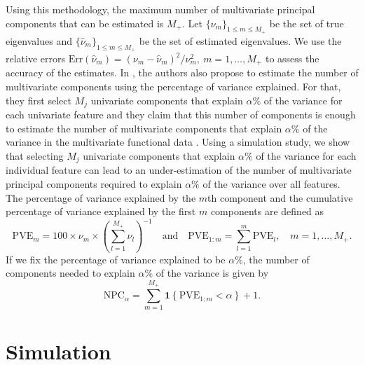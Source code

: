 \documentclass{article}
\newcounter{th}
\begin{document}
Using this methodology, the maximum number of multivariate principal components that can be estimated is $M_+$. Let $\{\nu_m\}_{1 \leq m \leq M_+}$ be the set of true eigenvalues and $\{\widehat{\nu}_m\}_{1 \leq m \leq M_+}$ be the set of estimated eigenvalues. We use the relative errors $\text{Err}(\widehat{\nu}_m)  = (\nu_m - \widehat{\nu}_m)^2 / \nu^2_m,~m = 1, \ldots, M_+$ to assess the accuracy of the estimates. In \cite{happMultivariateFunctionalPrincipal2018}, the authors also propose to estimate the number of multivariate components using the percentage of variance explained. For that, they first select $M_j$ univariate components that explain $\alpha\%$ of the variance for each univariate feature \cite[Chapter 8.2]{ramsayFunctionalDataAnalysis2005} and they claim that this number of components is enough to estimate the number of multivariate components that explain $\alpha\%$ of the variance in the multivariate functional data \cite[Section 3.2]{happMultivariateFunctionalPrincipal2018}. Using a simulation study, we show that selecting $M_j$ univariate components that explain $\alpha\%$ of the variance for each individual feature can lead to an under-estimation of the number of multivariate principal components required to explain $\alpha\%$ of the variance over all features. The percentage of variance explained by the $m$th component and the cumulative percentage of variance explained by the first $m$ components are defined as
\begin{equation}\label{eq:pve}
     \text{PVE}_m = 100 \times \nu_m \times \left(\sum_{l = 1}^{M_+} \nu_l\right)^{-1} \quad\text{and}\quad \text{PVE}_{1:m} = \sum_{l = 1}^m \text{PVE}_l, \quad m = 1, \dots, M_+.
\end{equation}
If we fix the percentage of variance explained to be $\alpha\%$, the number of components needed to explain $\alpha\%$ of the variance is given by
\begin{equation}\label{eq:npc}
     \text{NPC}_{\alpha} = \sum_{m = 1}^{M_{+}} \mathbf{1}\left\{\text{PVE}_{1:m} < \alpha\right\} + 1.
\end{equation}



\section{Simulation} %
\label{sec:simulation}
\end{document}
